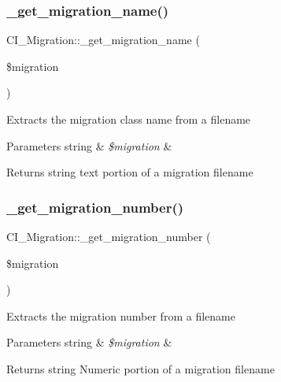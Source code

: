 \subsubsection{\texorpdfstring{\+\_\+get\+\_\+migration\+\_\+name()}{\_get\_migration\_name()}}
{\footnotesize\ttfamily C\+I\+\_\+\+Migration\+::\+\_\+get\+\_\+migration\+\_\+name (\begin{DoxyParamCaption}\item[{}]{\$migration }\end{DoxyParamCaption})\hspace{0.3cm}{\ttfamily [protected]}}

Extracts the migration class name from a filename


\begin{DoxyParams}[1]{Parameters}
string & {\em \$migration} & \\
\hline
\end{DoxyParams}
\begin{DoxyReturn}{Returns}
string text portion of a migration filename 
\end{DoxyReturn}
\mbox{\label{class_c_i___migration_afe3f332b9713a56b56b8c7ff3d920b1a}} 
\subsubsection{\texorpdfstring{\+\_\+get\+\_\+migration\+\_\+number()}{\_get\_migration\_number()}}
{\footnotesize\ttfamily C\+I\+\_\+\+Migration\+::\+\_\+get\+\_\+migration\+\_\+number (\begin{DoxyParamCaption}\item[{}]{\$migration }\end{DoxyParamCaption})\hspace{0.3cm}{\ttfamily [protected]}}

Extracts the migration number from a filename


\begin{DoxyParams}[1]{Parameters}
string & {\em \$migration} & \\
\hline
\end{DoxyParams}
\begin{DoxyReturn}{Returns}
string Numeric portion of a migration filename 
\end{DoxyReturn}
\mbox{\label{class_c_i___migration_a976baf03036c7dbd5cf135e6de82eeda}} 
